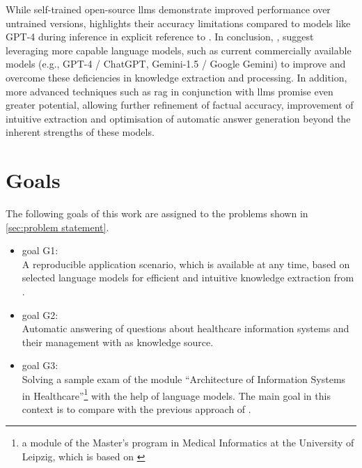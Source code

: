 While self-trained open-source \ac{llm}s demonstrate improved performance over untrained versions, \citet{Paul_Keller} highlights their accuracy limitations compared to models like GPT-4 during inference in explicit reference to \citet{bb2}.
In conclusion, \citet{Paul_Keller}, suggest leveraging more capable language models, such as current commercially available models (e.g., GPT-4 / ChatGPT, Gemini-1.5 / Google Gemini) to improve and overcome these deficiencies in knowledge extraction and processing.
In addition, more advanced techniques such as \ac{rag} in conjunction with \ac{llm}s promise even greater potential, allowing further refinement of factual accuracy, improvement of intuitive extraction and optimisation of automatic answer generation beyond the inherent strengths of these models.\\
%

\section{Goals}\label{sec:goals}
The following goals of this work are assigned to the problems shown in \cref{sec:problem statement}.
\begin{itemize}
  \item goal G1:\\
    A reproducible application scenario, which is available at any time, based on selected language models for efficient and intuitive knowledge extraction from \citet{bb2}.
   \item goal G2:\\
    Automatic answering of questions about healthcare information systems and their management with \citet{bb2} as knowledge source.
  \item goal G3:\\
   Solving a sample exam of the module \enquote{Architecture of Information Systems in Healthcare}\footnote{\raggedright{}a module of the Master's program in Medical Informatics at the University of Leipzig, which is based on \citet{bb2}} with the help of language models.
   The main goal in this context is to compare with the previous approach of \citet{Paul_Keller}.
   
\end{itemize}
